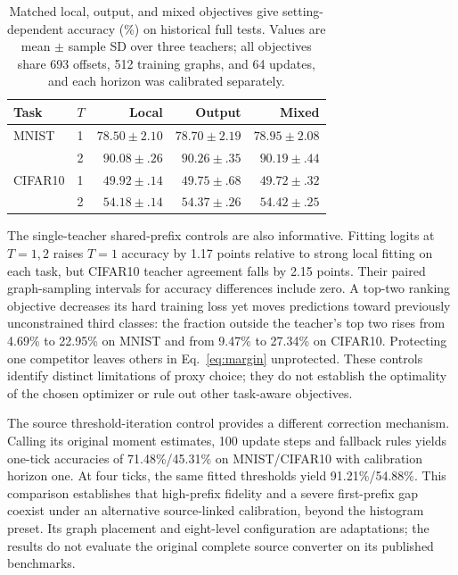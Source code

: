 \documentclass[10pt,twocolumn,letterpaper]{article}
\begin{document}
\begin{table}[t]
\caption{Matched local, output, and mixed objectives give setting-dependent accuracy (\%) on historical full tests. Values are mean $\pm$ sample SD over three teachers; all objectives share 693 offsets, 512 training graphs, and 64 updates, and each horizon was calibrated separately.}
\label{tab:calibration}
\centering\small\setlength{\tabcolsep}{3pt}
\begin{tabular}{llrrr}\toprule
Task & $T$ & Local & Output & Mixed\\\midrule
MNIST & 1 & $78.50\pm2.10$ & $78.70\pm2.19$ & $78.95\pm2.08$\\
 & 2 & $90.08\pm.26$ & $90.26\pm.35$ & $90.19\pm.44$\\
CIFAR10 & 1 & $49.92\pm.14$ & $49.75\pm.68$ & $49.72\pm.32$\\
 & 2 & $54.18\pm.14$ & $54.37\pm.26$ & $54.42\pm.25$\\\bottomrule
\end{tabular}
\end{table}

The single-teacher shared-prefix controls are also informative. Fitting logits at $T=1,2$ raises $T=1$ accuracy by 1.17 points relative to strong local fitting on each task, but CIFAR10 teacher agreement falls by 2.15 points. Their paired graph-sampling intervals for accuracy differences include zero. A top-two ranking objective decreases its hard training loss yet moves predictions toward previously unconstrained third classes: the fraction outside the teacher's top two rises from 4.69\% to 22.95\% on MNIST and from 9.47\% to 27.34\% on CIFAR10. Protecting one competitor leaves others in Eq.~\eqref{eq:margin} unprotected. These controls identify distinct limitations of proxy choice; they do not establish the optimality of the chosen optimizer or rule out other task-aware objectives.

The source threshold-iteration control provides a different correction mechanism. Calling its original moment estimates, 100 update steps and fallback rules yields one-tick accuracies of 71.48\%/45.31\% on MNIST/CIFAR10 with calibration horizon one. At four ticks, the same fitted thresholds yield 91.21\%/54.88\%. This comparison establishes that high-prefix fidelity and a severe first-prefix gap coexist under an alternative source-linked calibration, beyond the histogram preset. Its graph placement and eight-level configuration are adaptations; the results do not evaluate the original complete source converter on its published benchmarks.
\end{document}
